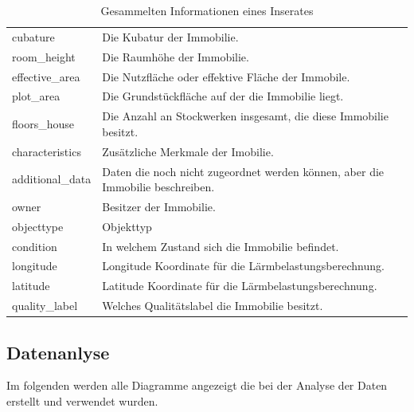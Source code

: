 \begin{table}[ht]
{\begin{tabular}{@{}ll@{}}
  cubature & Die Kubatur der Immobilie.\\
  room\_height & Die Raumhöhe der Immobilie.\\
  effective\_area & Die Nutzfläche oder effektive Fläche der Immobile.\\
  plot\_area & Die Grundstückfläche auf der die Immobilie liegt.\\
  floors\_house & Die Anzahl an Stockwerken insgesamt, die diese Immobilie besitzt.\\
  characteristics & Zusätzliche Merkmale der Imobilie.\\
  additional\_data & Daten die noch nicht zugeordnet werden können, aber die Immobilie beschreiben.\\
  owner  & Besitzer der Immobilie.\\
  objecttype & Objekttyp\\
  condition & In welchem Zustand sich die Immobilie befindet.\\
  longitude & Longitude Koordinate für die Lärmbelastungsberechnung.\\
  latitude & Latitude Koordinate für die Lärmbelastungsberechnung.\\
  quality\_label & Welches Qualitätslabel die Immobilie besitzt.\\
  \bottomrule
\end{tabular}}
\caption{Gesammelten Informationen eines Inserates}
\label{tab:crawled_info}
\end{table}

\subsection{Datenanlyse}
\label{daten_analys}
Im folgenden werden alle Diagramme angezeigt die bei der Analyse der Daten erstellt und verwendet wurden.

